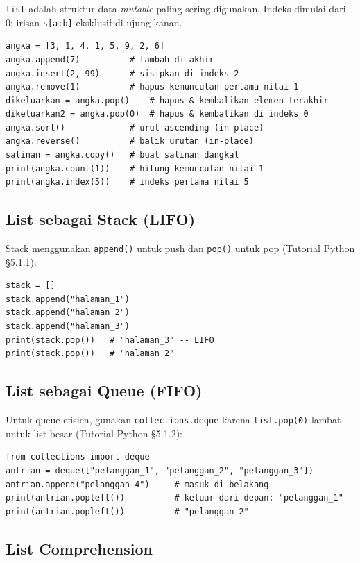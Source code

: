 \documentclass[../main.tex]{subfiles}
\begin{document}
\texttt{list} adalah struktur data \textit{mutable} paling sering digunakan. Indeks dimulai dari 0; irisan \texttt{s[a:b]} eksklusif di ujung kanan.

\begin{lstlisting}[caption=Metode list lengkap (Tutorial Python ss5.1)]
angka = [3, 1, 4, 1, 5, 9, 2, 6]
angka.append(7)          # tambah di akhir
angka.insert(2, 99)      # sisipkan di indeks 2
angka.remove(1)          # hapus kemunculan pertama nilai 1
dikeluarkan = angka.pop()    # hapus & kembalikan elemen terakhir
dikeluarkan2 = angka.pop(0)  # hapus & kembalikan di indeks 0
angka.sort()             # urut ascending (in-place)
angka.reverse()          # balik urutan (in-place)
salinan = angka.copy()   # buat salinan dangkal
print(angka.count(1))    # hitung kemunculan nilai 1
print(angka.index(5))    # indeks pertama nilai 5
\end{lstlisting}

\subsection{List sebagai Stack (LIFO)}

Stack menggunakan \texttt{append()} untuk push dan \texttt{pop()} untuk pop (Tutorial Python §5.1.1):

\begin{lstlisting}[caption=List sebagai stack]
stack = []
stack.append("halaman_1")
stack.append("halaman_2")
stack.append("halaman_3")
print(stack.pop())   # "halaman_3" -- LIFO
print(stack.pop())   # "halaman_2"
\end{lstlisting}

\subsection{List sebagai Queue (FIFO)}

Untuk queue efisien, gunakan \texttt{collections.deque} karena \texttt{list.pop(0)} lambat untuk list besar (Tutorial Python §5.1.2):

\begin{lstlisting}[caption=Queue dengan collections.deque]
from collections import deque
antrian = deque(["pelanggan_1", "pelanggan_2", "pelanggan_3"])
antrian.append("pelanggan_4")     # masuk di belakang
print(antrian.popleft())          # keluar dari depan: "pelanggan_1"
print(antrian.popleft())          # "pelanggan_2"
\end{lstlisting}

\subsection{List Comprehension}
\end{document}
